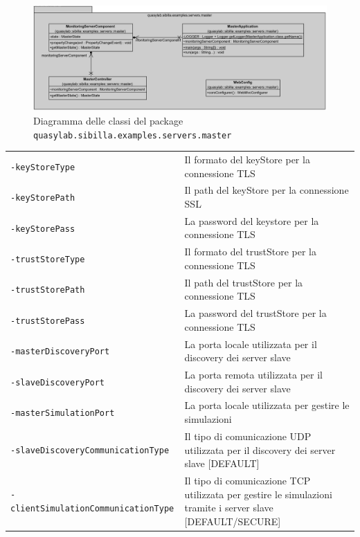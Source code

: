 \begin{figure}[H]
    \includegraphics[width=\linewidth]{images/quasylab.sibilla.examples.servers.master.png}
    \captionsetup{justification=centering}
    \caption{Diagramma delle classi del package \texttt{quasylab.sibilla.examples.servers.master}}
  \end{figure}

\begin{table}[H]
    \begin{tabularx}{\linewidth}{ l X }
        \texttt{-keyStoreType}         & Il formato del keyStore per la connessione TLS              \\
        \texttt{-keyStorePath}         & Il path del keyStore per la connessione SSL                  \\
        \texttt{-keyStorePass}         & La password del keystore per la connessione TLS               \\
        \texttt{-trustStoreType}       & Il formato del trustStore per la connessione TLS            \\
        \texttt{-trustStorePath}       & Il path del trustStore per la connessione TLS                \\
        \texttt{-trustStorePass}       & La password del trustStore per la connessione TLS            \\
        \texttt{-masterDiscoveryPort}  & La porta locale utilizzata per il discovery dei server slave \\
        \texttt{-slaveDiscoveryPort}   & La porta remota utilizzata per il discovery dei server slave \\
        \texttt{-masterSimulationPort} & La porta locale utilizzata per gestire le simulazioni        \\
        \texttt{-slaveDiscoveryCommunicationType}   & Il tipo di comunicazione UDP utilizzata per il discovery dei server slave {[}DEFAULT{]}     \\
        \texttt{-clientSimulationCommunicationType} & Il tipo di comunicazione TCP utilizzata per gestire le simulazioni tramite i server slave {[}DEFAULT/SECURE{]}
    \end{tabularx}
\end{table}

